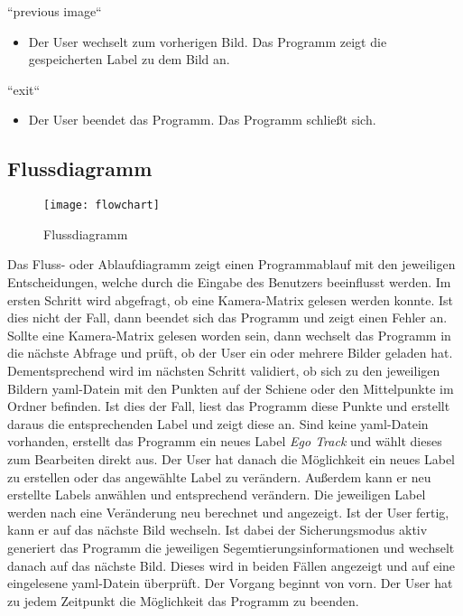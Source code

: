 \noindent
``previous image``

\begin{itemize}
	\item Der User wechselt zum vorherigen Bild. Das Programm zeigt die gespeicherten Label zu dem Bild an.
\end{itemize}

\noindent
``exit``
\begin{itemize}
	\item Der User beendet das Programm. Das Programm schließt sich.
\end{itemize}

\subsection{Flussdiagramm}
\label{sec:Flussdiagramm}
\begin{figure}[H]
  \texttt{[image: flowchart]}
  \caption{Flussdiagramm}
\end{figure}

Das Fluss- oder Ablaufdiagramm zeigt einen Programmablauf mit den jeweiligen Entscheidungen, welche durch die Eingabe des Benutzers beeinflusst werden.
Im ersten Schritt wird abgefragt, ob eine Kamera-Matrix gelesen werden konnte. Ist dies nicht der Fall, dann beendet sich das Programm und zeigt einen Fehler an. Sollte eine Kamera-Matrix gelesen worden sein, dann wechselt das Programm in die nächste Abfrage und prüft, ob der User ein oder mehrere Bilder geladen hat. Dementsprechend wird im nächsten Schritt validiert, ob sich zu den jeweiligen Bildern yaml-Datein mit den Punkten auf der Schiene oder den Mittelpunkte im Ordner befinden. Ist dies der Fall, liest das Programm diese Punkte und erstellt daraus die entsprechenden Label und zeigt diese an. Sind keine yaml-Datein vorhanden, erstellt das Programm ein neues Label \textit{Ego Track} und wählt dieses zum Bearbeiten direkt aus. Der User hat danach die Möglichkeit ein neues Label zu erstellen oder das angewählte Label zu verändern. Außerdem kann er neu erstellte Labels anwählen und entsprechend verändern. Die jeweiligen Label werden nach eine Veränderung neu berechnet und angezeigt. Ist der User fertig, kann er auf das nächste Bild wechseln. Ist dabei der Sicherungsmodus aktiv generiert das Programm die jeweiligen Segemtierungsinformationen und wechselt danach auf das nächste Bild. Dieses wird in beiden Fällen angezeigt und auf eine eingelesene yaml-Datein überprüft. Der Vorgang beginnt von vorn. Der User hat zu jedem Zeitpunkt die Möglichkeit das Programm zu beenden.


